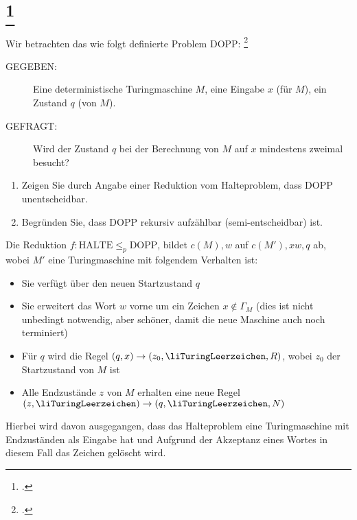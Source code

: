 \documentclass{lehramt-informatik-aufgabe}
\begin{document}
\section{
\footcite{examen:66115:2013:09}}

Wir betrachten das wie folgt definierte Problem DOPP:
\footcite[Aufgabe 8]{theo:ab:4}

\begin{description}
\item[GEGEBEN:]

Eine deterministische Turingmaschine $M$, eine Eingabe $x$ (für $M$),
ein Zustand $q$ (von $M$).

\item[GEFRAGT:]

Wird der Zustand $q$ bei der Berechnung von $M$ auf $x$ mindestens
zweimal besucht?
\end{description}

\begin{enumerate}


\item Zeigen Sie durch Angabe einer Reduktion vom Halteproblem, dass
DOPP unentscheidbar.

\item Begründen Sie, dass DOPP rekursiv aufzählbar (semi-entscheidbar)
ist.

\end{enumerate}

Die Reduktion $f \colon \text{HALTE} \leq_p \text{DOPP}$, bildet $c(M),
w$ auf $c(M'), xw, q$ ab, wobei $M'$ eine Turingmaschine mit folgendem
Verhalten ist:

\begin{itemize}
\item Sie verfügt über den neuen Startzustand $q$

\item Sie erweitert das Wort $w$ vorne um ein Zeichen $x \notin
\Gamma_M$ (dies ist nicht unbedingt notwendig, aber schöner, damit die
neue Maschine auch noch terminiert)

\item Für $q$ wird die Regel $(q, x) \rightarrow (z_0,
\liTuringLeerzeichen, R)$, wobei $z_0$ der Startzustand von $M$ ist

\item Alle Endzustände $z$ von $M$ erhalten eine neue Regel $(z,
\liTuringLeerzeichen) \rightarrow (q, \liTuringLeerzeichen, N)$
\end{itemize}

Hierbei wird davon ausgegangen, dass das Halteproblem eine
Turingmaschine mit Endzuständen als Eingabe hat und Aufgrund der
Akzeptanz eines Wortes in diesem Fall das Zeichen gelöscht wird.
\end{document}
